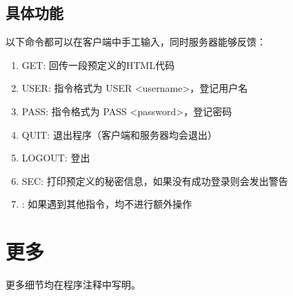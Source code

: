 \documentclass[a4paper,12pt]{article}
\begin{document}
\begin{CJK}{UTF8}{gbsn}
	\subsection{具体功能}
		以下命令都可以在客户端中手工输入，同时服务器能够反馈：
		\begin{enumerate}
		\item GET: 回传一段预定义的HTML代码
		\item USER: 指令格式为 USER <username>，登记用户名
		\item PASS: 指令格式为 PASS <password>，登记密码
		\item QUIT: 退出程序（客户端和服务器均会退出）
		\item LOGOUT: 登出
		\item SEC: 打印预定义的秘密信息，如果没有成功登录则会发出警告
		\item \*: 如果遇到其他指令，均不进行额外操作
		\end{enumerate}

\section{更多}
	更多细节均在程序注释中写明。

\end{CJK}
\end{document}
